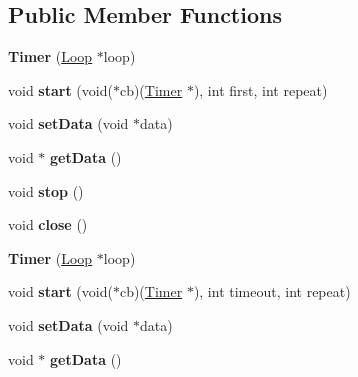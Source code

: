 \subsection*{Public Member Functions}
\begin{DoxyCompactItemize}
\item 
\mbox{\label{struct_timer_aafe8e3251652ea3482cf51d8c25520d1}} 
{\bfseries Timer} (\mbox{\hyperlink{struct_loop}{Loop}} $\ast$loop)
\item 
\mbox{\label{struct_timer_afc8820e12da3b47744a7a0dd4e69a88c}} 
void {\bfseries start} (void($\ast$cb)(\mbox{\hyperlink{struct_timer}{Timer}} $\ast$), int first, int repeat)
\item 
\mbox{\label{struct_timer_a965f0022acec271f4f5c9ca8a551f1ca}} 
void {\bfseries set\+Data} (void $\ast$data)
\item 
\mbox{\label{struct_timer_af2511d90de52aa58628721203dda5d7a}} 
void $\ast$ {\bfseries get\+Data} ()
\item 
\mbox{\label{struct_timer_a63f0eb44b27402196590a03781515dba}} 
void {\bfseries stop} ()
\item 
\mbox{\label{struct_timer_ab1b89acadd68bab394dd3fb757554267}} 
void {\bfseries close} ()
\item 
\mbox{\label{struct_timer_aafe8e3251652ea3482cf51d8c25520d1}} 
{\bfseries Timer} (\mbox{\hyperlink{struct_loop}{Loop}} $\ast$loop)
\item 
\mbox{\label{struct_timer_abdc914e6e39a4c8dc8d48bd023f21abd}} 
void {\bfseries start} (void($\ast$cb)(\mbox{\hyperlink{struct_timer}{Timer}} $\ast$), int timeout, int repeat)
\item 
\mbox{\label{struct_timer_a965f0022acec271f4f5c9ca8a551f1ca}} 
void {\bfseries set\+Data} (void $\ast$data)
\item 
\mbox{\label{struct_timer_af2511d90de52aa58628721203dda5d7a}} 
void $\ast$ {\bfseries get\+Data} ()
\item 
\mbox{\label{struct_timer_a63f0eb44b27402196590a03781515dba}} 

\end{DoxyCompactItemize}
